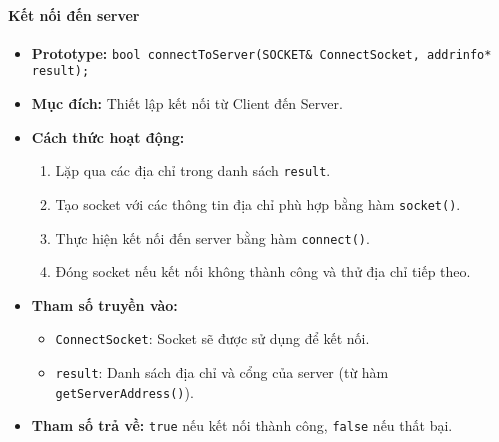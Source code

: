 \paragraph{\textbf{Kết nối đến server}}
\begin{itemize}
    \item \textbf{Prototype:} \texttt{bool connectToServer(SOCKET\& ConnectSocket, addrinfo* result);}
    
    \item \textbf{Mục đích:} Thiết lập kết nối từ Client đến Server.
    
    \item \textbf{Cách thức hoạt động:}
    \begin{enumerate}
        \item Lặp qua các địa chỉ trong danh sách \texttt{result}.
        \item Tạo socket với các thông tin địa chỉ phù hợp bằng hàm \texttt{socket()}.
        \item Thực hiện kết nối đến server bằng hàm \texttt{connect()}.
        \item Đóng socket nếu kết nối không thành công và thử địa chỉ tiếp theo.
    \end{enumerate}
    
    \item \textbf{Tham số truyền vào:}
    \begin{itemize}
        \item \texttt{ConnectSocket}: Socket sẽ được sử dụng để kết nối.
        \item \texttt{result}: Danh sách địa chỉ và cổng của server (từ hàm \texttt{getServerAddress()}).
    \end{itemize}
    
    \item \textbf{Tham số trả về:} \texttt{true} nếu kết nối thành công, \texttt{false} nếu thất bại.
\end{itemize}

